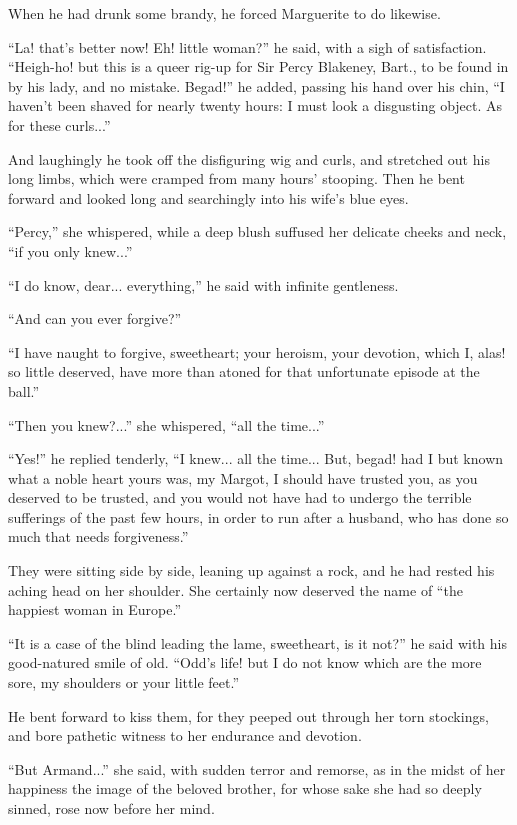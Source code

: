 \documentclass[paper=5.5in:8.5in,BCOR=7mm,twoside,DIV=calc,12pt,usegeometry,chapterprefix,endperiod,headings=big]{scrbook}
\begin{document}
When he had drunk some brandy, he forced Marguerite to do likewise.

\enquote{La! that's better now! Eh! little woman?} he said, with a sigh of satisfaction. \enquote{Heigh-ho! but this is a queer rig-up for Sir Percy Blakeney, Bart., to be found in by his lady, and no mistake. Begad!} he added, passing his hand over his chin, \enquote{I haven't been shaved for nearly twenty hours: I must look a disgusting object. As for these curls...}

And laughingly he took off the disfiguring wig and curls, and stretched out his long limbs, which were cramped from many hours’ stooping. Then he bent forward and looked long and searchingly into his wife's blue eyes.

\enquote{Percy,} she whispered, while a deep blush suffused her delicate cheeks and neck, \enquote{if you only knew...}

\enquote{I do know, dear... everything,} he said with infinite gentleness.

\enquote{And can you ever forgive?}

\enquote{I have naught to forgive, sweetheart; your heroism, your devotion, which I, alas! so little deserved, have more than atoned for that unfortunate episode at the ball.}

\enquote{Then you knew?...} she whispered, \enquote{all the time...}

\enquote{Yes!} he replied tenderly, \enquote{I knew... all the time... But, begad! had I but known what a noble heart yours was, my Margot, I should have trusted you, as you deserved to be trusted, and you would not have had to undergo the terrible sufferings of the past few hours, in order to run after a husband, who has done so much that needs forgiveness.}

They were sitting side by side, leaning up against a rock, and he had rested his aching head on her shoulder. She certainly now deserved the name of \enquote{the happiest woman in Europe.}

\enquote{It is a case of the blind leading the lame, sweetheart, is it not?} he said with his good-natured smile of old. \enquote{Odd's life! but I do not know which are the more sore, my shoulders or your little feet.}

He bent forward to kiss them, for they peeped out through her torn stockings, and bore pathetic witness to her endurance and devotion.

\enquote{But Armand...} she said, with sudden terror and remorse, as in the midst of her happiness the image of the beloved brother, for whose sake she had so deeply sinned, rose now before her mind.
\end{document}
